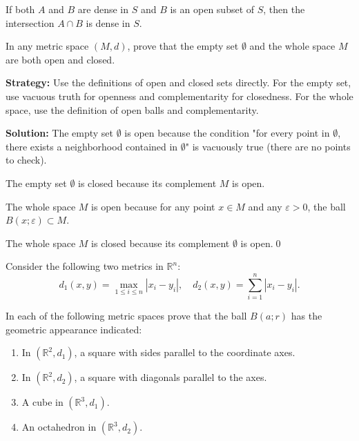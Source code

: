 \begin{theorem}
If both $A$ and $B$ are dense in $S$ and $B$ is an open subset of $S$, then the intersection $A \cap B$ is dense in $S$.
\end{theorem}



\begin{problembox}
\begin{problemstatement}
In any metric space \((M, d)\), prove that the empty set \( \emptyset \) and the whole space \( M \) are both open and closed.
\end{problemstatement}
\end{problembox}

\noindent\textbf{Strategy:} Use the definitions of open and closed sets directly. For the empty set, use vacuous truth for openness and complementarity for closedness. For the whole space, use the definition of open balls and complementarity.

\noindent\bigskip\noindent\textbf{Solution:} The empty set $\emptyset$ is open because the condition "for every point in $\emptyset$, there exists a neighborhood contained in $\emptyset$" is vacuously true (there are no points to check).

The empty set $\emptyset$ is closed because its complement $M$ is open.

The whole space $M$ is open because for any point $x \in M$ and any $\varepsilon > 0$, the ball $B(x;\varepsilon) \subset M$.

The whole space $M$ is closed because its complement $\emptyset$ is open.\qed


\begin{problembox}
\begin{problemstatement}
Consider the following two metrics in \( \mathbb{R}^n \):
\[d_1(x, y) = \max_{1 \leq i \leq n} |x_i - y_i|, \quad d_2(x, y) = \sum_{i=1}^n |x_i - y_i|.\]

In each of the following metric spaces prove that the ball \( B(a; r) \) has the geometric appearance indicated:
\begin{enumerate}[label=\alph*)]
\item In \( (\mathbb{R}^2, d_1) \), a square with sides parallel to the coordinate axes.
\item In \( (\mathbb{R}^2, d_2) \), a square with diagonals parallel to the axes.
\item A cube in \( (\mathbb{R}^3, d_1) \).
\item An octahedron in \( (\mathbb{R}^3, d_2) \).
\end{enumerate}
\end{problemstatement}
\end{problembox}

